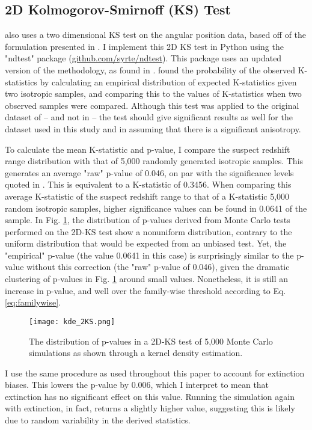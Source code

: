 \documentclass[fleqn,usenatbib]{mnras}
\begin{document}
\subsection{2D Kolmogorov-Smirnoff (KS) Test}
\label{2dks}
\citet{horvath2014} also uses a two dimensional KS test on the angular position data, based off of the formulation presented in \citet{peacock1983}. I implement this 2D KS test in Python using the "ndtest" package (\hyperlink{https://github.com/syrte/ndtest}{github.com/syrte/ndtest}). This package uses an updated version of the \citet{peacock1983} methodology, as found in \citet{fasano1987}. \citet{horvath2014} found the probability of the observed K-statistics by calculating an empirical distribution of expected K-statistics given two isotropic samples, and comparing this to the values of K-statistics when two observed samples were compared. 
Although this test was applied to the original dataset of \citet{horvath2014} -- and not in \citet{horvath2015} -- the test should give significant results as well for the dataset used in this study and in \citet{horvath2015} assuming that there is a significant anisotropy. 

To calculate the mean K-statistic and p-value, I compare the suspect redshift range distribution with that of 5,000 randomly generated isotropic samples. This generates an average "raw" p-value of 0.046, on par with the significance levels quoted in \citet{horvath2014}. This is equivalent to a K-statistic of 0.3456. When comparing this average K-statistic of the suspect redshift range to that of a K-statistic 5,000 random isotropic samples, higher significance values can be found in 0.0641 of the sample. In Fig. \ref{fig:2D-KS}, the distribution of p-values derived from Monte Carlo tests performed on the 2D-KS test show a nonuniform distribution, contrary to the uniform distribution that would be expected from an unbiased test. Yet, the "empirical" p-value (the value 0.0641 in this case) is surprisingly similar to the p-value without this correction (the "raw" p-value of 0.046), given the dramatic clustering of p-values in Fig.  \ref{fig:2D-KS} around small values. Nonetheless, it is still an increase in p-value, and well over the family-wise threshold according to Eq. \ref{eq:familywise}.
\begin{figure}
    \centering
    \texttt{[image: kde\_2KS.png]}
    \caption{The distribution of p-values in a 2D-KS test of 5,000 Monte Carlo simulations as shown through a kernel density estimation.}
    \label{fig:2D-KS}
\end{figure}
I use the same procedure as used throughout this paper to account for extinction biases. This lowers the p-value by 0.006, which I interpret to mean that extinction has no significant effect on this value. Running the simulation again with extinction, in fact, returns a slightly higher value, suggesting this is likely due to random variability in the derived statistics.
\end{document}
